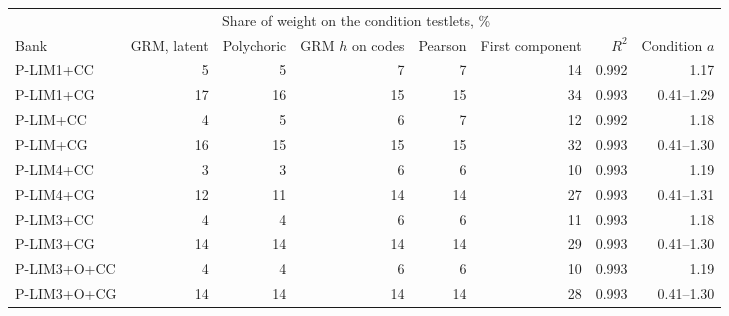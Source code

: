 \begin{center}\footnotesize\setlength{\tabcolsep}{4pt}
\begin{tabular}{@{}lrrrrrrr@{}}
\toprule
 & \multicolumn{5}{c}{Share of weight on the condition testlets, \%} & & \\
\cmidrule(lr){2-6}
Bank & GRM, latent & Polychoric & GRM $h$ on codes & Pearson & First component & $R^2$ & Condition $a$ \\
\midrule
P-LIM1+CC & 5 & 5 & 7 & 7 & 14 & 0.992 & 1.17 \\
P-LIM1+CG & 17 & 16 & 15 & 15 & 34 & 0.993 & 0.41--1.29 \\
P-LIM+CC & 4 & 5 & 6 & 7 & 12 & 0.992 & 1.18 \\
P-LIM+CG & 16 & 15 & 15 & 15 & 32 & 0.993 & 0.41--1.30 \\
P-LIM4+CC & 3 & 3 & 6 & 6 & 10 & 0.993 & 1.19 \\
P-LIM4+CG & 12 & 11 & 14 & 14 & 27 & 0.993 & 0.41--1.31 \\
P-LIM3+CC & 4 & 4 & 6 & 6 & 11 & 0.993 & 1.18 \\
P-LIM3+CG & 14 & 14 & 14 & 14 & 29 & 0.993 & 0.41--1.30 \\
P-LIM3+O+CC & 4 & 4 & 6 & 6 & 10 & 0.993 & 1.19 \\
P-LIM3+O+CG & 14 & 14 & 14 & 14 & 28 & 0.993 & 0.41--1.30 \\
\bottomrule
\end{tabular}
\end{center}
